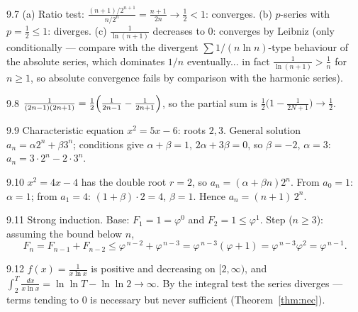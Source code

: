 \begin{solution}{9.7}
(a) Ratio test: $\frac{(n+1)/2^{n+1}}{n/2^{n}} = \frac{n+1}{2n} \to
\tfrac12 < 1$: converges. (b) $p$-series with $p = \tfrac12 \le 1$:
diverges. (c) $\frac{1}{\ln(n+1)}$ decreases to $0$: converges by Leibniz
(only conditionally --- compare with the divergent $\sum 1/(n \ln n)$-type
behaviour of the absolute series, which dominates $1/n$ eventually...
in fact $\frac{1}{\ln(n+1)} > \frac{1}{n}$ for $n \geq 1$, so absolute
convergence fails by comparison with the harmonic series).
\end{solution}

\begin{solution}{9.8}
$\frac{1}{(2n-1)(2n+1)} = \frac12\Bigl(\frac{1}{2n-1} -
\frac{1}{2n+1}\Bigr)$, so the partial sum is
$\frac12\bigl(1 - \frac{1}{2N+1}\bigr) \to \frac12$.
\end{solution}

\begin{solution}{9.9}
Characteristic equation $x^2 = 5x - 6$: roots $2, 3$. General solution
$a_n = \alpha 2^n + \beta 3^n$; conditions give $\alpha + \beta = 1$,
$2\alpha + 3\beta = 0$, so $\beta = -2$, $\alpha = 3$:
$a_n = 3 \cdot 2^{n} - 2 \cdot 3^{n}$.
\end{solution}

\begin{solution}{9.10}
$x^2 = 4x - 4$ has the double root $r = 2$, so
$a_n = (\alpha + \beta n)2^{n}$. From $a_0 = 1$: $\alpha = 1$; from
$a_1 = 4$: $(1 + \beta) \cdot 2 = 4$, $\beta = 1$. Hence
$a_n = (n + 1)\,2^{n}$.
\end{solution}

\begin{solution}{9.11}
Strong induction. Base: $F_1 = 1 = \varphi^{0}$ and
$F_2 = 1 \le \varphi^{1}$. Step ($n \ge 3$): assuming the bound below $n$,
\[
F_n = F_{n-1} + F_{n-2}
\le \varphi^{\,n-2} + \varphi^{\,n-3}
= \varphi^{\,n-3}(\varphi + 1)
= \varphi^{\,n-3}\varphi^{2} = \varphi^{\,n-1}.
\]
\end{solution}

\begin{solution}{9.12}
$f(x) = \frac{1}{x \ln x}$ is positive and decreasing on $[2,\infty)$, and
$\int_2^{T} \frac{dx}{x\ln x} = \ln \ln T - \ln\ln 2 \to \infty$. By the
integral test the series diverges --- terms tending to $0$ is necessary but
never sufficient (Theorem~\ref{thm:nec}).
\end{solution}
